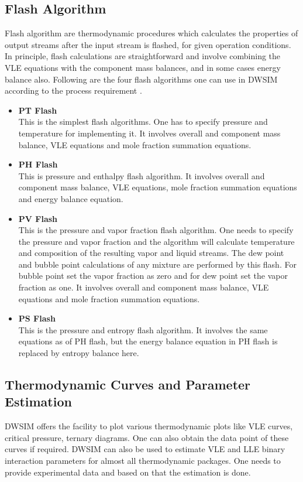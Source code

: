 \documentclass[12pt]{report}
\begin{document}
\subsection{Flash Algorithm}
Flash algorithm are thermodynamic procedures which calculates the properties of output streams after the input stream is flashed, for given operation conditions. In principle, flash calculations are straightforward and involve combining the VLE equations with the component mass balances, and in some cases energy balance also. Following are the four flash algorithms one can use in DWSIM according to the process requirement \cite{DWSIM}.

\begin{itemize}
\item{\textbf{PT Flash}} \\
This is the simplest flash algorithms. One has to specify pressure and temperature for implementing it. It involves overall and component mass balance, VLE equations and mole fraction summation equations.
\item{\textbf{PH Flash}} \\
This is pressure and enthalpy flash algorithm. It involves overall and component mass balance, VLE equations, mole fraction summation equations and energy balance equation.
\item{\textbf{PV Flash}} \\
This is the pressure and vapor fraction flash algorithm. One needs to specify the pressure and vapor fraction and the algorithm will calculate temperature and composition of the resulting vapor and liquid streams. The dew point and bubble point calculations of any mixture are performed by this flash. For bubble point set the vapor fraction as zero and for dew point set the vapor fraction as one. It involves overall and component mass balance, VLE equations and mole fraction summation equations.
\item{\textbf{PS Flash}} \\
This is the pressure and entropy flash algorithm. It involves the same equations as of PH flash, but the energy balance equation in PH flash is replaced by entropy balance here.
\end{itemize}

\subsection {Thermodynamic Curves and Parameter Estimation}
DWSIM offers the facility to plot various thermodynamic plots like VLE curves, critical pressure, ternary diagrams. One can also obtain the data point of these curves if required.
DWSIM can also be used to estimate VLE and LLE binary interaction parameters for almost all thermodynamic packages. One needs to provide experimental data and based on that the estimation is done.
\end{document}
